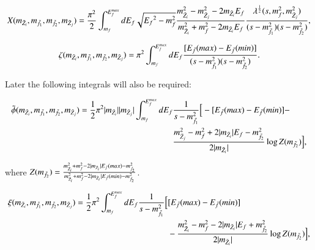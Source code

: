 \documentclass[final,3p,times,pdflatex]{elsarticle}
\begin{document}
\begin{equation}  \label{Xintegral}
X(m_{\tilde{Z}_i},m_{\tilde{f}_1},m_{\tilde{f}_2},m_{\tilde{Z}_j}) ={\pi^2 \over 2} \int_{m_{f}}^{E^{max}_{f}} dE_f \sqrt{{E_f}^2 - m_{f}^2} {m_{\tilde{Z}_i}^2 - m_{\tilde{Z}_j}^2 - 2m_{\tilde{Z}_i}E_{f} \over m_{\tilde{Z}_i}^2 + m_{f}^2 - 2m_{\tilde{Z}_i}E_{f}} {\lambda^{1 \over 2} (s,m_{f}^2, m_{\tilde{Z}_j}^2) \over (s-m_{\tilde{f}_1}^2)(s-m_{\tilde{f}_2}^2)},
\end{equation}


\begin{equation} \label{zetaintegral}
\zeta(m_{\tilde{Z}_i},m_{\tilde{f}_1},m_{\tilde{f}_2},m_{\tilde{Z}_j}) = \pi^2 \int_{m_{f}}^{E^{max}_{f}} dE_f {[E_{\bar{f}}(max) - E_{\bar{f}}(min)] \over (s-m_{\tilde{f}_1}^2)(s-m_{\tilde{f}_2}^2)}.
\end{equation}

Later the following integrals will also be required:


\begin{equation} \label{phitildaintegral}
\begin{aligned}
\tilde{\phi}(m_{\tilde{Z}_i},m_{\tilde{f}_1},m_{\tilde{f}_2},m_{\tilde{Z}_j}) = {1 \over 2} \pi^2 |m_{\tilde{Z}_i}||m_{\tilde{Z}_j}| \int_{m_{f}}^{E^{max}_{f}} dE_f & {1 \over s-m_{\tilde{f}_1}^2} \Big[-[E_{\bar{f}}(max) - E_{\bar{f}}(min)] - \\ & {m_{\tilde{Z}_j}^2 - m_{f}^2 + 2|m_{\tilde{Z}_i}|E_f - m_{\tilde{f}_2}^2 \over 2|m_{\tilde{Z}_i}|} \log Z(m_{\tilde{f}_2})\Big] ,
\end{aligned}
\end{equation}

where $Z(m_{\tilde{f}_2}) = {m_{\tilde{Z}_i}^2 + m_{f}^2 - 2|m_{\tilde{Z}_i}|E_{\bar{f}}(max) - m_{\tilde{f}_2}^2 \over m_{\tilde{Z}_i}^2 + m_{f}^2 - 2|m_{\tilde{Z}_i}|E_{\bar{f}}(min) - m_{\tilde{f}_2}^2}$.



\begin{equation} \label{xiintegral}
\begin{aligned}
\xi(m_{\tilde{Z}_i},m_{\tilde{f}_1},m_{\tilde{f}_2},m_{\tilde{Z}_j}) = {1 \over 2} \pi^2 \int_{m_{f}}^{E^{max}_{f}} dE_f {1 \over s-m_{\tilde{f}_1}^2} \Big[&[E_{\bar{f}}(max) - E_{\bar{f}}(min)] \\ & - {m_{\tilde{Z}_i}^2 - m_{f}^2 - 2|m_{\tilde{Z}_i}|E_f + m_{\tilde{f}_2}^2 \over 2|m_{\tilde{Z}_i}|} \log Z(m_{\tilde{f}_2})\Big] ,
\end{aligned}
\end{equation}
\end{document}
